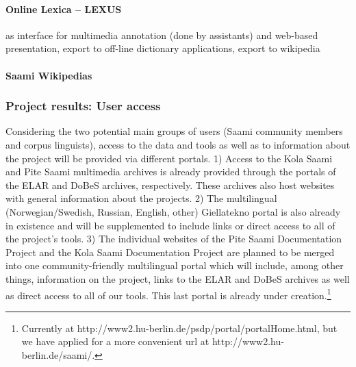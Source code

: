 \documentclass[a4paper,12pt]{article}
\begin{document}
\paragraph{Online Lexica – LEXUS}%
 as interface for multimedia annotation (done by assistants) and web-based presentation, export to off-line dictionary applications, export to wikipedia %

\paragraph{Saami Wikipedias}%

\subsubsection{Project results: User access}\label{projectResult3}
Considering the two potential main groups of users (Saami community members and corpus linguists), access to the data and tools as well as to information about the project will be provided via different portals. 1) Access to the Kola Saami and Pite Saami multimedia archives is already provided through the portals of the ELAR and DoBeS archives, respectively. These archives also host websites with general information about the projects. 2) The multilingual (Norwegian/Swedish, Russian, English, other) Giellatekno portal is also already in existence and will be supplemented to include links or direct access to all of the project's tools. 3) The individual websites of the Pite Saami Documentation Project and the Kola Saami Documentation Project are planned to be merged into one community-friendly multilingual portal which will include, among other things, information on the project, links to the ELAR and DoBeS archives as well as direct access to all of our tools. This last portal is already under creation.\footnote{Currently at http://www2.hu-berlin.de/psdp/portal/portalHome.html, but we have applied for a more convenient url at http://www2.hu-berlin.de/saami/.}
\end{document}
